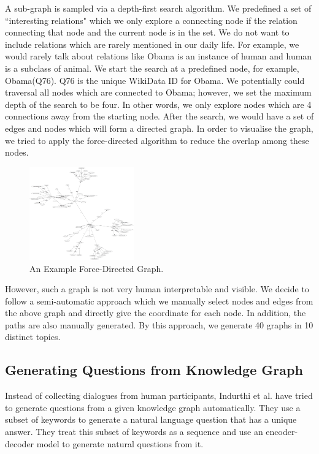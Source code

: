 \documentclass[bsc,frontabs,twoside,singlespacing,parskip,deptreport]{infthesis}     %
\begin{document}
A sub-graph is sampled via a depth-first search algorithm. We predefined a set of ``interesting relations" which we only explore a connecting node if the relation connecting that node and the current node is in the set. We do not want to include relations which are rarely mentioned in our daily life. For example, we would rarely talk about relations like Obama is an instance of human and human is a subclass of animal. We start the search at a predefined node, for example, Obama(Q76). Q76 is the unique WikiData ID for Obama. We potentially could traversal all nodes which are connected to Obama; however, we set the maximum depth of the search to be four. In other words, we only explore nodes which are 4 connections away from the starting node. After the search, we would have a set of edges and nodes which will form a directed graph. In order to visualise the graph, we tried to apply the force-directed algorithm to reduce the overlap among these nodes.

\begin{figure}[h]
    \centering
    \includegraphics[width=0.4\textwidth]{directed.png}
    \caption{An Example Force-Directed Graph.}
    \label{fig:obama}
\end{figure}

However, such a graph is not very human interpretable and visible. We decide to follow a semi-automatic approach which we manually select nodes and edges from the above graph and directly give the coordinate for each node. In addition, the paths are also manually generated. By this approach, we generate 40 graphs in 10 distinct topics.

\subsection{Generating Questions from Knowledge Graph}

Instead of collecting dialogues from human participants, Indurthi et al. \cite{indurthi2017generating} have tried to generate questions from a given knowledge graph automatically. They use a subset of keywords to generate a natural language question that has a unique answer. They treat this subset of keywords as a sequence and use an encoder-decoder model to generate natural questions from it.
\end{document}
